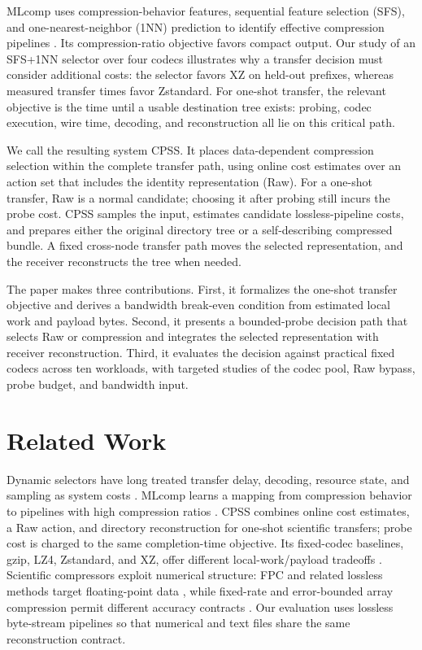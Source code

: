 \documentclass[smallabstract,smallcaptions]{dccpaper}
\renewcommand{\Section}[1]{\vspace*{-0.05in}\section{#1}\vspace{0.025in}}
\begin{document}
MLcomp uses compression-behavior features, sequential feature selection (SFS), and one-nearest-neighbor (1NN) prediction to identify effective compression pipelines \cite{burtchell2024mlcomp}. Its compression-ratio objective favors compact output. Our study of an SFS+1NN selector over four codecs illustrates why a transfer decision must consider additional costs: the selector favors XZ on held-out prefixes, whereas measured transfer times favor Zstandard. For one-shot transfer, the relevant objective is the time until a usable destination tree exists: probing, codec execution, wire time, decoding, and reconstruction all lie on this critical path.

We call the resulting system CPSS. It places data-dependent compression selection within the complete transfer path, using online cost estimates over an action set that includes the identity representation (Raw). For a one-shot transfer, Raw is a normal candidate; choosing it after probing still incurs the probe cost. CPSS samples the input, estimates candidate lossless-pipeline costs, and prepares either the original directory tree or a self-describing compressed bundle. A fixed cross-node transfer path moves the selected representation, and the receiver reconstructs the tree when needed.

The paper makes three contributions. First, it formalizes the one-shot transfer objective and derives a bandwidth break-even condition from estimated local work and payload bytes. Second, it presents a bounded-probe decision path that selects Raw or compression and integrates the selected representation with receiver reconstruction. Third, it evaluates the decision against practical fixed codecs across ten workloads, with targeted studies of the codec pool, Raw bypass, probe budget, and bandwidth input.

\Section{Related Work}

Dynamic selectors have long treated transfer delay, decoding, resource state, and sampling as system costs \cite{krintz2001,wiseman2004,knutsson1999}. MLcomp learns a mapping from compression behavior to pipelines with high compression ratios \cite{burtchell2024mlcomp}. CPSS combines online cost estimates, a Raw action, and directory reconstruction for one-shot scientific transfers; probe cost is charged to the same completion-time objective. Its fixed-codec baselines, gzip, LZ4, Zstandard, and XZ, offer different local-work/payload tradeoffs \cite{gzip,lz4,zstd,xz}. Scientific compressors exploit numerical structure: FPC and related lossless methods target floating-point data \cite{burtscher2009,lindstrom2006,azami2025}, while fixed-rate and error-bounded array compression permit different accuracy contracts \cite{zfp2014,sz3_2023}. Our evaluation uses lossless byte-stream pipelines so that numerical and text files share the same reconstruction contract.
\end{document}
